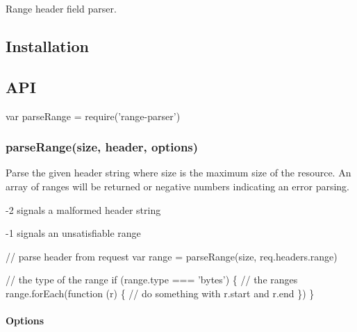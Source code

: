 \href{https://npmjs.org/package/range-parser}{\tt } \href{https://npmjs.org/package/range-parser}{\tt } \href{https://nodejs.org/endownload}{\tt } \href{https://travis-ci.org/jshttp/range-parser}{\tt } \href{https://coveralls.io/r/jshttp/range-parser}{\tt }

Range header field parser.

\subsection*{Installation}




\subsection*{A\+PI}


\begin{DoxyCode}
var parseRange = require('range-parser')
\end{DoxyCode}


\subsubsection*{parse\+Range(size, header, options)}

Parse the given {\ttfamily header} string where {\ttfamily size} is the maximum size of the resource. An array of ranges will be returned or negative numbers indicating an error parsing.


\begin{DoxyItemize}
\item {\ttfamily -\/2} signals a malformed header string
\item {\ttfamily -\/1} signals an unsatisfiable range
\end{DoxyItemize}


\begin{DoxyCode}
// parse header from request
var range = parseRange(size, req.headers.range)

// the type of the range
if (range.type === 'bytes') \{
  // the ranges
  range.forEach(function (r) \{
    // do something with r.start and r.end
  \})
\}
\end{DoxyCode}


\paragraph*{Options}

